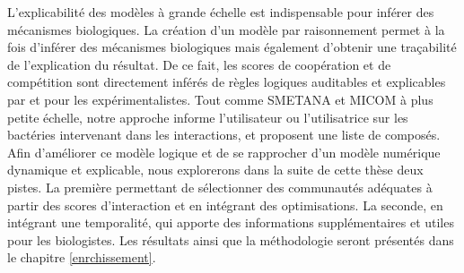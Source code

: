\documentclass[../main.tex]{subfiles}
\begin{document}
L'explicabilité des modèles à grande échelle est indispensable pour inférer des mécanismes biologiques. La création d'un modèle par raisonnement permet à la fois d'inférer des mécanismes biologiques mais également d'obtenir une traçabilité de l'explication du résultat. De ce fait, les scores de coopération et de compétition sont directement inférés de règles logiques auditables et explicables par et pour les expérimentalistes. Tout comme SMETANA et MICOM à plus petite échelle, notre approche informe l'utilisateur ou l'utilisatrice sur les bactéries intervenant dans les interactions, et proposent une liste de composés. \\

Afin d'améliorer ce modèle logique et de se rapprocher d'un modèle numérique dynamique et explicable, nous explorerons dans la suite de cette thèse deux pistes. La première permettant de sélectionner des communautés adéquates à partir des scores d'interaction et en intégrant des optimisations. La seconde, en intégrant une temporalité, qui apporte des informations supplémentaires et utiles pour les biologistes. Les résultats ainsi que la méthodologie seront présentés dans le chapitre \ref{enrchissement}.
\end{document}

